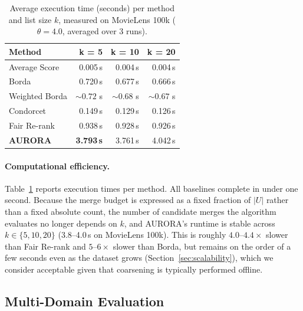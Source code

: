 \documentclass[a4paper,fleqn]{cas-dc}
\begin{document}
\begin{table}[h!]
\caption{Average execution time (seconds) per method and list size $k$,
         measured on MovieLens 100k ($\theta = 4.0$, averaged over 3 runs).}
\label{tab:runtime}
\centering
\begin{tabular}{lrrr}
\hline
\textbf{Method} & \textbf{k = 5} & \textbf{k = 10} & \textbf{k = 20} \\
\hline
Average Score  &   0.005\,s &   0.004\,s &   0.004\,s \\
Borda          &   0.720\,s &   0.677\,s &   0.666\,s \\
Weighted Borda & ${\sim}0.72$ s & ${\sim}0.68$ s & ${\sim}0.67$ s \\
Condorcet      &   0.149\,s &   0.129\,s &   0.126\,s \\
Fair Re-rank   &   0.938\,s &   0.928\,s &   0.926\,s \\
\textbf{AURORA}  & \textbf{3.793\,s} & 3.761\,s &   4.042\,s \\
\hline
\end{tabular}
\end{table}

\paragraph{Computational efficiency.}
Table~\ref{tab:runtime} reports execution times per method. All baselines complete in
under one second. Because the merge budget is expressed as a fixed
fraction of $|U|$ rather than a fixed absolute count, the number of
candidate merges the algorithm evaluates no longer depends on $k$, and
AURORA's runtime is stable across $k \in \{5, 10, 20\}$ (3.8--4.0\,s on
MovieLens 100k). This is roughly $4.0$--$4.4\times$ slower than Fair Re-rank
and $5$--$6\times$ slower than Borda, but remains on the order of a
few seconds even as the dataset grows (Section~\ref{sec:scalability}), which we consider
acceptable given that coarsening is typically performed offline.

\subsection{Multi-Domain Evaluation}
\end{document}
